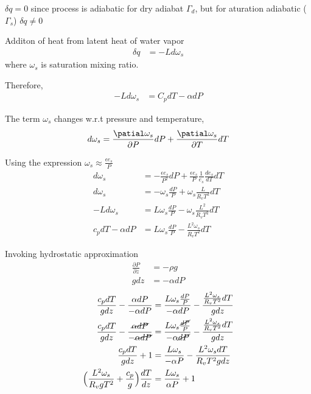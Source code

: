 \documentclass[fleqn,10pt]{SelfArx} %
\begin{document}
$\delta q =0$ since process is adiabatic for dry adiabat $\Gamma_d$, but for aturation adiabatic ($\Gamma_s$) $\delta q \neq 0$

Additon of heat from latent heat of water vapor 
\begin{align}
    \delta q &= -Ld\omega_s
\end{align}
where $\omega_s$ is saturation mixing ratio.

Therefore,
\begin{align}
    -Ld\omega_s &= C_pdT - \alpha dP
\end{align}

The term $\omega_s$ changes w.r.t pressure and temperature,
\begin{align}
    d\omega_s = \frac{\patial \omega_s}{\partial P} dP +  \frac{\patial \omega_s}{\partial T} dT
\end{align}

Using the expression $\omega_s \approx \frac{\epsilon e_s}{P}$
\begin{align}
    d\omega_s &= -\frac{\epsilon e_s}{P^2} dP + \frac{\epsilon e_s}{P} \frac{1}{e_s}\frac{de_s}{dT}dT \\
    d\omega_s &= -\omega_s \frac{dP}{P} + \omega_s \frac{L}{R_v T^2}dT \\
    -Ld\omega_s &= L\omega_s\frac{dP}{P} - \omega_s \frac{L^2}{R_v T^2}dT \\
    c_pdT - \alpha dP &= L\omega_s \frac{dP}{P} - \frac{L^2\omega_s}{R_vT^2}dT
\end{align}

Invoking hydrostatic approximation
\begin{align}
    \frac{\partial P}{\partial z} &= -\rho g \\
    gdz &= -\alpha dP
\end{align}
\begin{align}
    \frac{c_pdT}{gdz} - \frac{\alpha dP}{-\alpha dP} &= \frac{L\omega_s \frac{dP}{P}}{-\alpha dP} - \frac{\frac{L^2\omega_s}{R_vT^2}dT}{gdz} \\
    \frac{c_pdT}{gdz} - \frac{\cancel{\alpha dP}}{-\cancel{\alpha dP}} &= \frac{L\omega_s \frac{\cancel{dP}}{P}}{-\alpha \cancel{dP}} - \frac{\frac{L^2\omega_s}{R_vT^2}dT}{gdz} \\
    \frac{c_pdT}{gdz} + 1 &= \frac{L\omega_s}{-\alpha P} - \frac{L^2\omega_sdT}{R_v T^2 gdz}\\
    \Big(\frac{L^2\omega_s}{R_v g T^2} + \frac{c_p}{g}\Big)\frac{dT}{dz} &= \frac{L\omega_s}{\alpha P} +1 \label{eq:lapse_rate}
\end{align}
\end{document}
